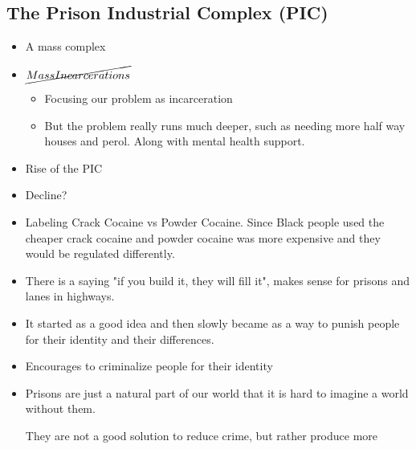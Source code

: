 \documentclass{article}
\begin{document}
\subsection{The Prison Industrial Complex (PIC)}
\begin{itemize}
  \item A mass complex
  \item $\cancel{Mass Incarcerations}$
    \begin{itemize}
      \item Focusing our problem as incarceration
      \item But the problem really runs much deeper, such
        as needing more half way houses and perol. Along with mental health support.
    \end{itemize}
  \item Rise of the PIC
  \item Decline?
  \item Labeling Crack Cocaine vs Powder Cocaine. Since Black people used the cheaper
    crack cocaine and powder cocaine was more expensive and they would be
    regulated differently.
  \item There is a saying "if you build it, they will fill it", makes sense for
    prisons and lanes in highways.
  \item It started as a good idea and then slowly became as a way to punish
    people for their identity and their differences.
  \item Encourages to criminalize people for their identity
  \item Prisons are just a natural part of our world that it is hard
    to imagine a world without them.

    They are not a good solution to reduce crime, but rather produce more
\end{itemize}
\end{document}
